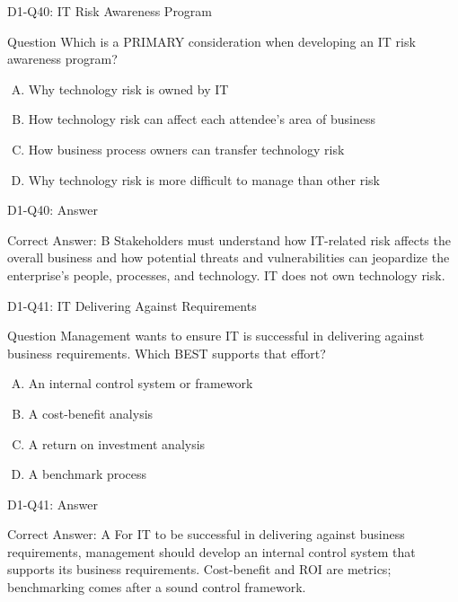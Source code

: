 \documentclass{beamer}
\begin{document}
	\begin{frame}{D1-Q40: IT Risk Awareness Program}
		\begin{block}{Question}
			Which is a PRIMARY consideration when developing an IT risk awareness program?
		\end{block}
		\begin{enumerate}[(A)]
			\item Why technology risk is owned by IT
			\item How technology risk can affect each attendee's area of business
			\item How business process owners can transfer technology risk
			\item Why technology risk is more difficult to manage than other risk
		\end{enumerate}
	\end{frame}
	\begin{frame}{D1-Q40: Answer}
		\begin{block}{Correct Answer: B}
			Stakeholders must understand how IT-related risk affects the overall business and how potential threats and vulnerabilities can jeopardize the enterprise's people, processes, and technology. IT does not own technology risk.
		\end{block}
	\end{frame}
	
	\begin{frame}{D1-Q41: IT Delivering Against Requirements}
		\begin{block}{Question}
			Management wants to ensure IT is successful in delivering against business requirements. Which BEST supports that effort?
		\end{block}
		\begin{enumerate}[(A)]
			\item An internal control system or framework
			\item A cost-benefit analysis
			\item A return on investment analysis
			\item A benchmark process
		\end{enumerate}
	\end{frame}
	\begin{frame}{D1-Q41: Answer}
		\begin{block}{Correct Answer: A}
			For IT to be successful in delivering against business requirements, management should develop an internal control system that supports its business requirements. Cost-benefit and ROI are metrics; benchmarking comes after a sound control framework.
		\end{block}
	\end{frame}
	
\end{document}
